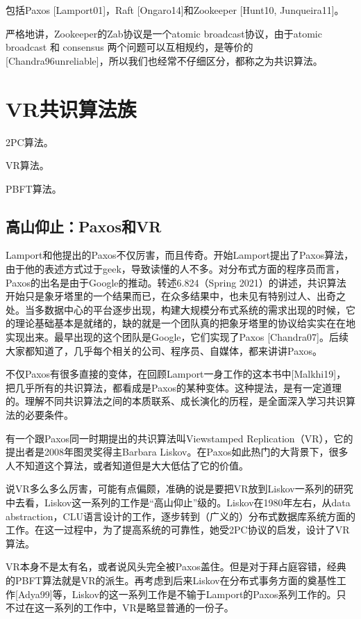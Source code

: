 \documentclass[UTF8]{ctexrep}
\begin{document}
包括Paxos [Lamport01]，Raft [Ongaro14]和Zookeeper [Hunt10, Junqueira11]。

严格地讲，Zookeeper的Zab协议是一个atomic broadcast协议，由于atomic broadcast 和 consensus 两个问题可以互相规约，是等价的[Chandra96unreliable]，所以我们也经常不仔细区分，都称之为共识算法。

\chapter{VR共识算法族}

2PC算法。

VR算法。

PBFT算法。

\section{高山仰止：Paxos和VR}

Lamport和他提出的Paxos不仅厉害，而且传奇。开始Lamport提出了Paxos算法，由于他的表述方式过于geek，导致读懂的人不多。对分布式方面的程序员而言，Paxos的出名是由于Google的推动。转述6.824（Spring 2021）的讲述，共识算法开始只是象牙塔里的一个结果而已，在众多结果中，也未见有特别过人、出奇之处。当多数据中心的平台逐步出现，构建大规模分布式系统的需求出现的时候，它的理论基础基本是就绪的，缺的就是一个团队真的把象牙塔里的协议给实实在在地实现出来。最早出现的这个团队是Google，它们实现了Paxos [Chandra07]。后续大家都知道了，几乎每个相关的公司、程序员、自媒体，都来讲讲Paxos。

不仅Paxos有很多直接的变体，在回顾Lamport一身工作的这本书中[Malkhi19]，把几乎所有的共识算法，都看成是Paxos的某种变体。这种提法，是有一定道理的。理解不同共识算法之间的本质联系、成长演化的历程，是全面深入学习共识算法的必要条件。

有一个跟Paxos同一时期提出的共识算法叫Viewstamped Replication（VR），它的提出者是2008年图灵奖得主Barbara Liskov。在Paxos如此热门的大背景下，很多人不知道这个算法，或者知道但是大大低估了它的价值。

说VR多么多么厉害，可能有点偏颇，准确的说是要把VR放到Liskov一系列的研究中去看，Liskov这一系列的工作是“高山仰止”级的。Liskov在1980年左右，从data abstraction，CLU语言设计的工作，逐步转到（广义的）分布式数据库系统方面的工作。在这一过程中，为了提高系统的可靠性，她受2PC协议的启发，设计了VR算法。

VR本身不是太有名，或者说风头完全被Paxos盖住。但是对于拜占庭容错，经典的PBFT算法就是VR的派生。再考虑到后来Liskov在分布式事务方面的奠基性工作[Adya99]等，Liskov的这一系列工作是不输于Lamport的Paxos系列工作的。只不过在这一系列的工作中，VR是略显普通的一份子。
\end{document}
